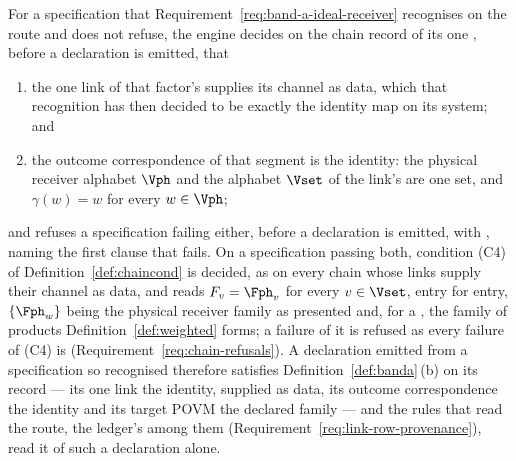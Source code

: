 \begin{requirement}\label{req:band-a-identity-link}
For a specification that Requirement~\ref{req:band-a-ideal-receiver}
recognises on the  route and does not refuse, the engine
decides on the chain record of its one , before a
declaration is emitted, that
\begin{enumerate}[label=(\roman*),leftmargin=2.2em]
\item the one link of that factor's  supplies its
  channel as data, which that recognition has then decided to be exactly the
  identity map on its system; and
\item the outcome correspondence of that segment is the identity: the
  physical receiver alphabet $\Vph$ and the alphabet $\Vset$ of the link's
   are one set, and $\gamma(w)=w$ for every
  $w\in\Vph$;
\end{enumerate}
and refuses a specification failing either, before a declaration is emitted,
with , naming the first clause that fails. On
a specification passing both, condition (C4) of
Definition~\ref{def:chaincond} is decided, as on every chain whose links
supply their channel as data, and reads $F_v=\Fph_v$ for every $v\in\Vset$,
entry for entry, $\{\Fph_w\}$ being the physical receiver family as presented
and, for a , the family of products
Definition~\ref{def:weighted} forms; a failure of it is refused as every
failure of (C4) is (Requirement~\ref{req:chain-refusals}). A declaration
emitted from a specification so recognised therefore satisfies
Definition~\ref{def:banda}\,(b) on its record --- its one link the identity,
supplied as data, its outcome correspondence the identity and its target
POVM the declared family --- and the rules that read the route, the ledger's
among them (Requirement~\ref{req:link-row-provenance}), read it of such a
declaration alone.
\end{requirement}
